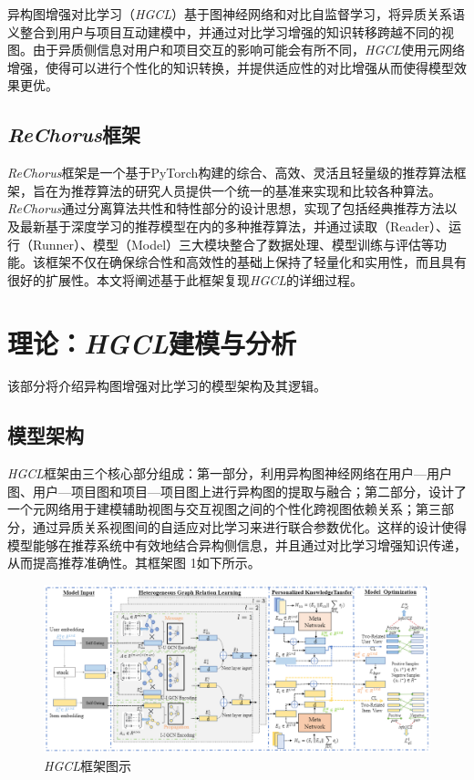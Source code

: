 \documentclass{article}
\begin{document}
异构图增强对比学习（\emph{HGCL}）\cite{Chen_2023}基于图神经网络和对比自监督学习，将异质关系语义整合到用户与项目互动建模中，并通过对比学习增强的知识转移跨越不同的视图。由于异质侧信息对用户和项目交互的影响可能会有所不同，\emph{HGCL}使用元网络增强，使得可以进行个性化的知识转换，并提供适应性的对比增强从而使得模型效果更优。

\subsection{\emph{ReChorus}框架}

\emph{ReChorus}框架是一个基于PyTorch构建的综合、高效、灵活且轻量级的推荐算法框架\cite{wang2020make}，旨在为推荐算法的研究人员提供一个统一的基准来实现和比较各种算法。\emph{ReChorus}通过分离算法共性和特性部分的设计思想，实现了包括经典推荐方法以及最新基于深度学习的推荐模型在内的多种推荐算法，并通过读取（Reader）、运行（Runner）、模型（Model）三大模块整合了数据处理、模型训练与评估等功能。该框架不仅在确保综合性和高效性的基础上保持了轻量化和实用性，而且具有很好的扩展性。本文将阐述基于此框架复现\emph{HGCL}的详细过程。

\section{理论：\emph{HGCL}建模与分析}

该部分将介绍异构图增强对比学习的模型架构及其逻辑。

\subsection{模型架构}

\emph{HGCL}框架由三个核心部分组成：第一部分，利用异构图神经网络在用户—用户图、用户—项目图和项目—项目图上进行异构图的提取与融合；第二部分，设计了一个元网络用于建模辅助视图与交互视图之间的个性化跨视图依赖关系；第三部分，通过异质关系视图间的自适应对比学习来进行联合参数优化。这样的设计使得模型能够在推荐系统中有效地结合异构侧信息，并且通过对比学习增强知识传递，从而提高推荐准确性。其框架图 1如下所示。

\begin{figure}[htbp]
    \centering
    \includegraphics[width=1\textwidth]{figure1.png}
    \caption{\emph{HGCL}框架图示\cite{Chen_2023}}
    \label{fig:your_image_label}
\end{figure}
\end{document}
